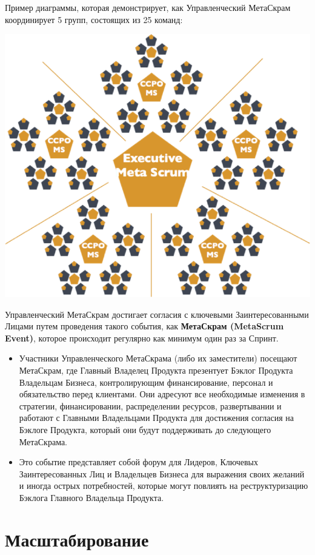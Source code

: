 \documentclass[12pt,a4paper,parskip=full]{scrartcl}
\begin{document}
Пример диаграммы, которая демонстрирует, как Управленческий МетаСкрам координирует 5 групп, состоящих из 25 команд: 

\includegraphics[width=1.0\linewidth]{ExecMetaScrum.png}

Управленческий МетаСкрам достигает согласия с ключевыми Заинтересованными Лицами путем проведения такого события, как \textbf{МетаСкрам (MetaScrum Event)}, которое происходит регулярно как минимум один раз за Спринт.

\begin{itemize}
	\item Участники Управленческого МетаСкрама (либо их заместители) посещают МетаСкрам, где Главный Владелец Продукта презентует Бэклог Продукта Владельцам Бизнеса, контролирующим финансирование, персонал и обязательство перед клиентами. Они адресуют все необходимые изменения в стратегии, финансировании, распределении ресурсов, развертывании и работают с Главными Владельцами Продукта для достижения согласия на Бэклоге Продукта, который они будут поддерживать до следующего МетаСкрама.
	\item Это событие представляет собой форум для Лидеров, Ключевых Заинтересованных Лиц и Владельцев Бизнеса для выражения своих желаний и иногда острых потребностей, которые могут повлиять на реструктуризацию Бэклога Главного Владельца Продукта.
\end{itemize}

\section{Масштабирование}
\end{document}
